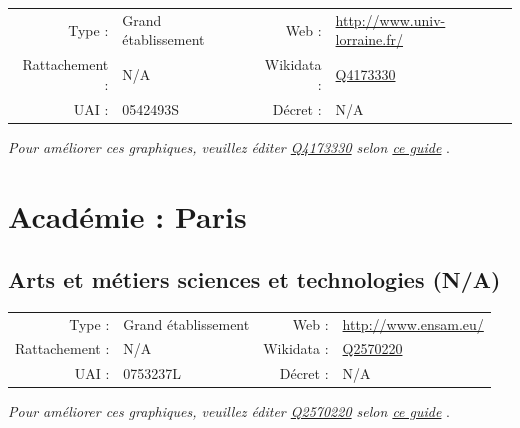 \documentclass[11pt,french,landscape]{article}
\begin{document}
\begin{tabular*}{0.45\textwidth}{rp{2cm}rl}  
\hline  
Type : & Grand établissement & Web : &\href{http://www.univ-lorraine.fr/}{http://www.univ-lorraine.fr/} \\  
Rattachement : & N/A & Wikidata : & \href{https://www.wikidata.org/entity/Q4173330}{Q4173330} \\  
UAI : & 0542493S & Décret : & N/A \\  
\hline  
\end{tabular*}

\textit{\scriptsize Pour améliorer ces graphiques, veuillez éditer \href{https://www.wikidata.org/entity/Q4173330}{Q4173330}  selon \href{https://github.com/cpesr/wikidataESR/blob/master/Rmd/wikidataESR.md}{ce guide}}
.


\newpage

\hypertarget{acaduxe9mie-paris-1}{%
\section{Académie : Paris}\label{acaduxe9mie-paris-1}}

\hypertarget{arts-et-muxe9tiers-sciences-et-technologies-na}{%
\subsection{Arts et métiers sciences et technologies
(N/A)}\label{arts-et-muxe9tiers-sciences-et-technologies-na}}

\begin{tabular*}{0.45\textwidth}{rp{2cm}rl}  
\hline  
Type : & Grand établissement & Web : &\href{http://www.ensam.eu/}{http://www.ensam.eu/} \\  
Rattachement : & N/A & Wikidata : & \href{https://www.wikidata.org/entity/Q2570220}{Q2570220} \\  
UAI : & 0753237L & Décret : & N/A \\  
\hline  
\end{tabular*}

\textit{\scriptsize Pour améliorer ces graphiques, veuillez éditer \href{https://www.wikidata.org/entity/Q2570220}{Q2570220}  selon \href{https://github.com/cpesr/wikidataESR/blob/master/Rmd/wikidataESR.md}{ce guide}}
.

\end{document}
